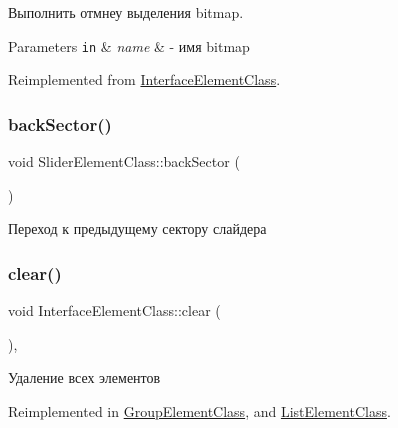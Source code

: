 Выполнить отмнеу выделения bitmap. 


\begin{DoxyParams}[1]{Parameters}
\mbox{\tt in}  & {\em name} & -\/ имя bitmap \\
\hline
\end{DoxyParams}


Reimplemented from \hyperlink{class_interface_element_class_a906729d7cf4a4db85520c8e516007685}{Interface\+Element\+Class}.

\mbox{\label{class_slider_element_class_a4866508a0ef1ade9a3eb09ba00f06577}} 
\subsubsection{\texorpdfstring{back\+Sector()}{backSector()}}
{\footnotesize\ttfamily void Slider\+Element\+Class\+::back\+Sector (\begin{DoxyParamCaption}{ }\end{DoxyParamCaption})}



Переход к предыдущему сектору слайдера 

\mbox{\label{class_interface_element_class_a0bc6d608e1d1c6bebb6507b7f9a8a220}} 
\subsubsection{\texorpdfstring{clear()}{clear()}}
{\footnotesize\ttfamily void Interface\+Element\+Class\+::clear (\begin{DoxyParamCaption}{ }\end{DoxyParamCaption})\hspace{0.3cm}{\ttfamily [virtual]}, {\ttfamily [inherited]}}



Удаление всех элементов 



Reimplemented in \hyperlink{class_group_element_class_a162a930551375f92238a3d1604e05e6a}{Group\+Element\+Class}, and \hyperlink{class_list_element_class_a3c18a56481ec0a07b834eeccf111ea95}{List\+Element\+Class}.

